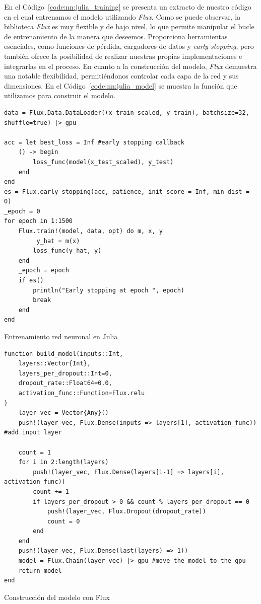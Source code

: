 \documentclass[11pt]{article}
\begin{document}
En el Código~\ref{code:nn:julia_training} se presenta un extracto de nuestro código en el cual entrenamos el modelo utilizando \textit{Flux}. Como se puede observar, la biblioteca \textit{Flux} es muy flexible y de bajo nivel, lo que permite manipular el bucle de entrenamiento de la manera que deseemos. Proporciona herramientas esenciales, como funciones de pérdida, cargadores de datos y \textit{early stopping}, pero también ofrece la posibilidad de realizar nuestras propias implementaciones e integrarlas en el proceso. En cuanto a la construcción del modelo, \textit{Flux} demuestra una notable flexibilidad, permitiéndonos controlar cada capa de la red y sus dimensiones. En el Código~\ref{code:nn:julia_model} se muestra la función que utilizamos para construir el modelo.

\begin{listing}[h]
\begin{verbatim}
data = Flux.Data.DataLoader((x_train_scaled, y_train), batchsize=32, shuffle=true) |> gpu
    
acc = let best_loss = Inf #early stopping callback
    () -> begin
        loss_func(model(x_test_scaled), y_test)
    end 
end
es = Flux.early_stopping(acc, patience, init_score = Inf, min_dist = 0)
_epoch = 0
for epoch in 1:1500
    Flux.train!(model, data, opt) do m, x, y
         y_hat = m(x)
        loss_func(y_hat, y)
    end
    _epoch = epoch
    if es()
        println("Early stopping at epoch ", epoch)
        break
    end
end
\end{verbatim}
\caption{Entrenamiento red neuronal en Julia}
\label{code:nn:julia_training}
\end{listing}

\begin{listing}[h]
\begin{verbatim}
function build_model(inputs::Int,
    layers::Vector{Int},
    layers_per_dropout::Int=0,
    dropout_rate::Float64=0.0,
    activation_func::Function=Flux.relu
)
    layer_vec = Vector{Any}()
    push!(layer_vec, Flux.Dense(inputs => layers[1], activation_func)) #add input layer

    count = 1
    for i in 2:length(layers)
        push!(layer_vec, Flux.Dense(layers[i-1] => layers[i], activation_func))
        count += 1
        if layers_per_dropout > 0 && count % layers_per_dropout == 0
            push!(layer_vec, Flux.Dropout(dropout_rate))
            count = 0
        end
    end
    push!(layer_vec, Flux.Dense(last(layers) => 1))
    model = Flux.Chain(layer_vec) |> gpu #move the model to the gpu
    return model
end
\end{verbatim}
\caption{Construcción del modelo con Flux}
\label{code:nn:julia_model}
\end{listing}
\end{document}

